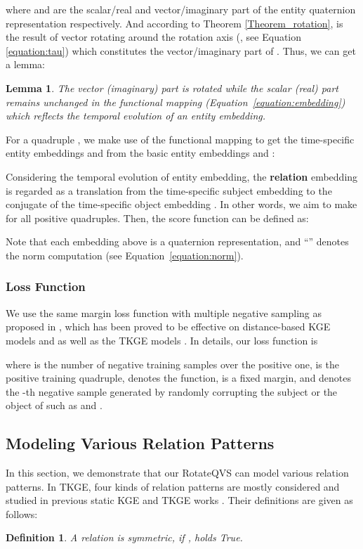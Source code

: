 \documentclass[11pt]{article}
\newtheorem{myDef}{Definition}
\newtheorem{lemma}{Lemma}
\begin{document}
where  and  are the scalar/real and vector/imaginary part of the entity quaternion representation  respectively. And according to Theorem \ref{Theorem_rotation},  is the result of vector  rotating  around the rotation axis  (, see Equation \ref{equation:tau}) which constitutes the vector/imaginary part of .
Thus, we can get a lemma:
\begin{lemma}\label{lemma:mapping}
The vector (imaginary) part is rotated while the scalar (real) part remains unchanged in the functional mapping (Equation~\ref{equation:embedding}) which reflects the temporal evolution of an entity embedding.
\end{lemma}

For a quadruple , we make use of the functional mapping to get the time-specific entity embeddings  and  from the basic entity embeddings  and :


Considering the temporal evolution of entity embedding, the \textbf{relation} embedding  is regarded as a translation from the time-specific subject embedding  to the conjugate of the time-specific object embedding .
In other words, we aim to make  for all positive quadruples. Then, the score function can be defined as:

Note that each embedding above is a quaternion representation, and ``'' denotes the norm computation (see Equation~\ref{equation:norm}).
 
\subsubsection{Loss Function}
We use the same margin loss function with multiple negative sampling as proposed in \cite{SunDNT19}, which has been proved to be effective on distance-based KGE models \cite{bordes2013translating,SunDNT19} and as well as the TKGE models \cite{xu2019temporal,xu2020tero}.
In details, our loss function is

where  is the number of negative training samples over the positive one,  is the positive training quadruple,  denotes the  function,  is a fixed margin, and  denotes the -th negative sample generated by randomly corrupting the subject or the object of  such as  and .



\subsection{Modeling Various Relation Patterns}

In this section, we demonstrate that our RotateQVS can model various relation patterns.
In TKGE, four kinds of relation patterns are mostly considered and studied in previous static KGE and TKGE works \cite{SunDNT19,gao2020rotate3d}.
Their definitions are given as follows:
\begin{myDef}
	\label{definition:r1}
    A relation  is symmetric, if ,   holds True.
\end{myDef}
\end{document}

